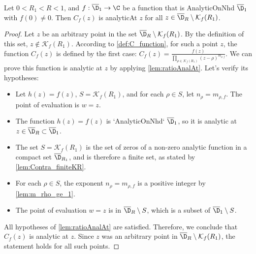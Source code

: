 \begin{lemma}\label{lem:C_analytic_off_K} \leanok {}
Let $0<R_1<R<1$, and $f:\overline{\D}_1\to\C$ be a function that is AnalyticOnNhd $\overline{\D}_1$ with $f(0)\neq0$. Then $C_f(z)$ is analyticAt $z$ for all $z \in \overline{\D}_R \setminus \mathcal{K}_f(R_1)$.
\end{lemma}
\begin{proof}
\leanok
Let $z$ be an arbitrary point in the set $\overline{\D}_R \setminus \mathcal{K}_f(R_1)$.
By the definition of this set, $z \notin \mathcal{K}_f(R_1)$.
According to \cref{def:C_function}, for such a point $z$, the function $C_f(z)$ is defined by the first case:
$C_f(z) = \frac{f(z)}{\prod_{\rho\in\mathcal{K}_f(R_1)}(z-\rho)^{m_{\rho,f}}}$.
We can prove this function is analytic at $z$ by applying \cref{lem:ratioAnalAt}. Let's verify its hypotheses:
\begin{itemize}
    \item Let $h(z) = f(z)$, $S = \mathcal{K}_f(R_1)$, and for each $\rho \in S$, let $n_\rho = m_{\rho,f}$. The point of evaluation is $w=z$.
    \item The function $h(z)=f(z)$ is `AnalyticOnNhd` $\overline{\D}_1$, so it is analytic at $z \in \overline{\D}_R \subset \overline{\D}_1$.
    \item The set $S = \mathcal{K}_f(R_1)$ is the set of zeros of a non-zero analytic function in a compact set $\overline{\D}_{R_1}$, and is therefore a finite set, as stated by \cref{lem:Contra_finiteKR}.
    \item For each $\rho \in S$, the exponent $n_\rho = m_{\rho,f}$ is a positive integer by \cref{lem:m_rho_ge_1}.
    \item The point of evaluation $w=z$ is in $\overline{\D}_R \setminus S$, which is a subset of $\overline{\D}_1 \setminus S$.
\end{itemize}
All hypotheses of \cref{lem:ratioAnalAt} are satisfied. Therefore, we conclude that $C_f(z)$ is analytic at $z$. Since $z$ was an arbitrary point in $\overline{\D}_R \setminus \mathcal{K}_f(R_1)$, the statement holds for all such points.
\end{proof}

